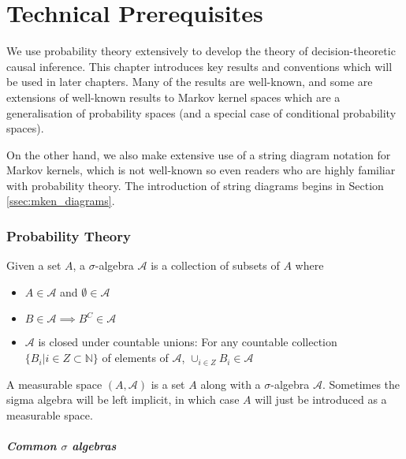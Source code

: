 

\chapter{Technical Prerequisites}

We use probability theory extensively to develop the theory of decision-theoretic causal inference. This chapter introduces key results and conventions which will be used in later chapters. Many of the results are well-known, and some are extensions of well-known results to Markov kernel spaces which are a generalisation of probability spaces (and a special case of conditional probability spaces).

On the other hand, we also make extensive use of a string diagram notation for Markov kernels, which is not well-known so even readers who are highly familiar with probability theory. The introduction of string diagrams begins in Section \ref{ssec:mken_diagrams}.

\subsection{Probability Theory}

Given a set $A$, a $\sigma$-algebra $\mathcal{A}$ is a collection of subsets of $A$ where
\begin{itemize}
	\item $A\in \mathcal{A}$ and $\emptyset\in \mathcal{A}$
	\item $B\in \mathcal{A}\implies B^C\in\mathcal{A}$
	\item $\mathcal{A}$ is closed under countable unions: For any countable collection $\{B_i|i\in Z\subset \mathbb{N}\}$ of elements of $\mathcal{A}$, $\cup_{i\in Z}B_i\in \mathcal{A}$ 
\end{itemize}

A measurable space $(A,\mathcal{A})$ is a set $A$ along with a $\sigma$-algebra $\mathcal{A}$. Sometimes the sigma algebra will be left implicit, in which case $A$ will just be introduced as a measurable space.

\paragraph{Common $\sigma$ algebras}

